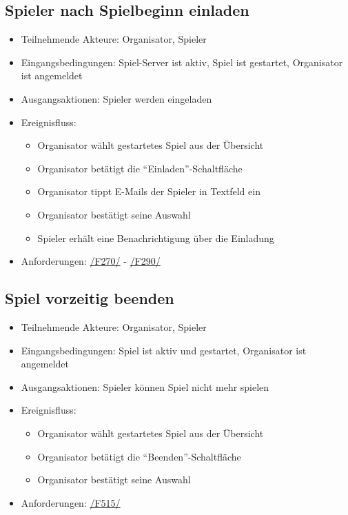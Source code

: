 \documentclass[a4paper]{scrreprt}
\begin{document}
    \subsection{Spieler nach Spielbeginn einladen}
    \begin{itemize}
        \item Teilnehmende Akteure: \Gls{Organisator}, \Gls{Spieler}
        \item Eingangsbedingungen: \Gls{Spiel-Server} ist aktiv, \Gls{Spiel} ist gestartet, \Gls{Organisator} ist angemeldet
        \item Ausgangsaktionen: \Gls{Spieler} werden eingeladen
        \item Ereignisfluss:
        \begin{itemize}
            \item \Gls{Organisator} wählt gestartetes \Gls{Spiel} aus der Übersicht
            \item \Gls{Organisator} betätigt die \enquote{Einladen}-Schaltfläche
            \item \Gls{Organisator} tippt E-Mails der \Gls{Spieler} in Textfeld ein
            \item \Gls{Organisator} bestätigt seine Auswahl
            \item \Gls{Spieler} erhält eine Benachrichtigung über die Einladung
        \end{itemize}
        \item Anforderungen: \hyperlink{F270}{/F270/} - \hyperlink{F290}{/F290/} 
    \end{itemize}

    \subsection{Spiel vorzeitig beenden}
    \begin{itemize}
        \item Teilnehmende Akteure: \Gls{Organisator}, \Gls{Spieler}
        \item Eingangsbedingungen: \Gls{Spiel} ist aktiv und gestartet, \Gls{Organisator} ist angemeldet
        \item Ausgangsaktionen: \Gls{Spieler} können \Gls{Spiel} nicht mehr spielen %
        \item Ereignisfluss:
        \begin{itemize}
            \item \Gls{Organisator} wählt gestartetes \Gls{Spiel} aus der Übersicht
            \item \Gls{Organisator} betätigt die \enquote{Beenden}-Schaltfläche
            \item \Gls{Organisator} bestätigt seine Auswahl
        \end{itemize}
        \item Anforderungen: \hyperlink{F515}{/F515/}
    \end{itemize}
\end{document}
